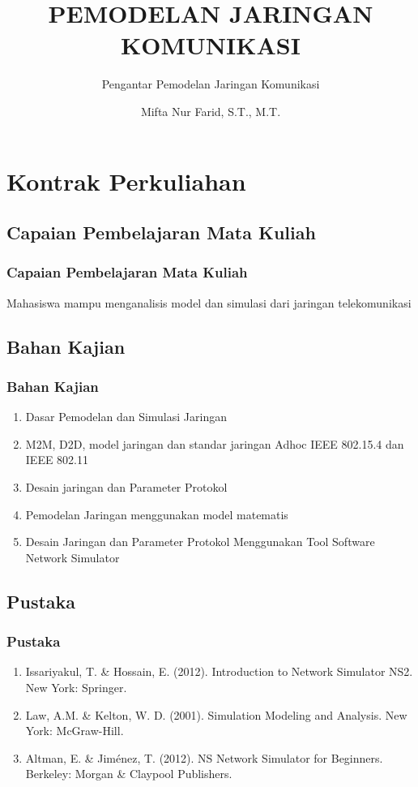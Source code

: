 \documentclass[pdflatex,compress]{beamer}
\title{PEMODELAN JARINGAN KOMUNIKASI}
\subtitle{Pengantar Pemodelan Jaringan Komunikasi}
\author{Mifta Nur Farid, S.T., M.T.}
\begin{document}
\maketitle


\section{Kontrak Perkuliahan}

\subsection{Capaian Pembelajaran Mata Kuliah}

\begin{frame}
	\frametitle{Capaian Pembelajaran Mata Kuliah}
	Mahasiswa mampu menganalisis model dan simulasi dari jaringan telekomunikasi
\end{frame}

\subsection{Bahan Kajian}

\begin{frame}
	\frametitle{Bahan Kajian}
	\begin{enumerate}
		\item Dasar Pemodelan dan Simulasi Jaringan
		\item M2M, D2D, model jaringan dan standar jaringan Adhoc IEEE 802.15.4 dan IEEE 802.11
		\item Desain jaringan dan Parameter Protokol
		\item Pemodelan Jaringan menggunakan model matematis
		\item Desain Jaringan dan Parameter Protokol Menggunakan Tool Software Network Simulator
	\end{enumerate}
\end{frame}

\subsection{Pustaka}

\begin{frame}
	\frametitle{Pustaka}
	\begin{enumerate}
		\item Issariyakul, T. \& Hossain, E. (2012). Introduction to Network Simulator NS2. New York: Springer.
		\item Law, A.M. \& Kelton, W. D. (2001). Simulation Modeling and Analysis. New York: McGraw-Hill.
		\item Altman, E. \& Jiménez, T. (2012). NS Network Simulator for Beginners. Berkeley: Morgan \& Claypool
		Publishers.
	\end{enumerate}
\end{frame}
\end{document}

